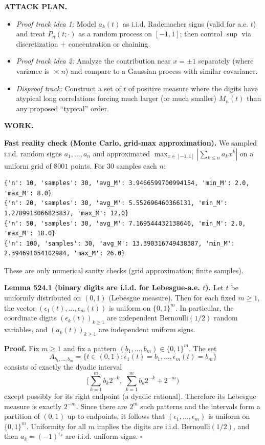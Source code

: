 \bigskip
\noindent\textbf{ATTACK PLAN.}
\begin{itemize}
\item \emph{Proof track idea 1:} Model $a_k(t)$ as i.i.d. Rademacher signs (valid for a.e. $t$) and treat $P_n(t;\cdot)$ as a random process on $[-1,1]$; then control $\sup$ via discretization + concentration or chaining.
\item \emph{Proof track idea 2:} Analyze the contribution near $x=\pm 1$ separately (where variance is $\asymp n$) and compare to a Gaussian process with similar covariance.
\item \emph{Disproof track:} Construct a set of $t$ of positive measure where the digits have atypical long correlations forcing much larger (or much smaller) $M_n(t)$ than any proposed ``typical'' order.
\end{itemize}

\bigskip
\noindent\textbf{WORK.}

\medskip
\noindent\textbf{Fast reality check (Monte Carlo, grid-max approximation).}
We sampled i.i.d. random signs $a_1,\dots,a_n$ and approximated $\max_{x\in[-1,1]}|\sum_{k\le n} a_k x^k|$ on a uniform grid of $8001$ points. For 30 samples each $n$:
\begin{verbatim}
{'n': 10, 'samples': 30, 'avg_M': 3.9466599700994154, 'min_M': 2.0, 'max_M': 8.0}
{'n': 20, 'samples': 30, 'avg_M': 5.552696460366131, 'min_M': 1.2789913066823837, 'max_M': 12.0}
{'n': 50, 'samples': 30, 'avg_M': 7.169544432138646, 'min_M': 2.0, 'max_M': 18.0}
{'n': 100, 'samples': 30, 'avg_M': 13.390316749438387, 'min_M': 2.394691054102984, 'max_M': 26.0}
\end{verbatim}
These are only numerical sanity checks (grid approximation; finite samples).

\medskip
\noindent\textbf{Lemma 524.1 (binary digits are i.i.d. for Lebesgue-a.e. $t$).}
Let $t$ be uniformly distributed on $(0,1)$ (Lebesgue measure). Then for each fixed $m\ge 1$, the vector $(\epsilon_1(t),\dots,\epsilon_m(t))$ is uniform on $\{0,1\}^m$. In particular, the coordinate digits $(\epsilon_k(t))_{k\ge 1}$ are independent Bernoulli$(1/2)$ random variables, and $(a_k(t))_{k\ge 1}$ are independent uniform signs.

\noindent\textbf{Proof.}
Fix $m\ge 1$ and fix a pattern $(b_1,\dots,b_m)\in\{0,1\}^m$. The set
\[A_{b_1,\dots,b_m}=\{t\in(0,1): \epsilon_1(t)=b_1,\dots,\epsilon_m(t)=b_m\}
\]
consists of exactly the dyadic interval
\[\Big[\sum_{k=1}^m b_k 2^{-k},\ \sum_{k=1}^m b_k 2^{-k}+2^{-m}\Big)
\]
except possibly for its right endpoint (a dyadic rational). Therefore its Lebesgue measure is exactly $2^{-m}$.
Since there are $2^m$ such patterns and the intervals form a partition of $(0,1)$ up to endpoints, it follows that $(\epsilon_1,\dots,\epsilon_m)$ is uniform on $\{0,1\}^m$.
Uniformity for all $m$ implies the digits are i.i.d. Bernoulli$(1/2)$, and then $a_k=(-1)^{\epsilon_k}$ are i.i.d. uniform signs.
\hfill$\square$


